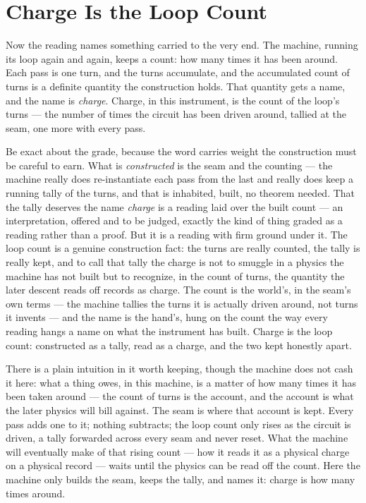 \section{Charge Is the Loop Count}

Now the reading names something carried to the very end. The machine, running its loop again and again, keeps a
count: how many times it has been around. Each pass is one turn, and the turns accumulate, and the accumulated
count of turns is a definite quantity the construction holds. That quantity gets a name, and the name is
\emph{charge}. Charge, in this instrument, is the count of the loop's turns --- the number of
times the circuit has been driven around, tallied at the seam, one more with every pass.

Be exact about the grade, because the word carries weight the construction must be careful to earn. What is
\emph{constructed} is the seam and the counting --- the machine really does re-instantiate each pass from the
last and really does keep a running tally of the turns, and that is inhabited, built, no theorem needed. That the
tally deserves the name \emph{charge} is a reading laid over the built count --- an interpretation, offered and to
be judged, exactly the kind of thing graded as a reading rather than a proof. But it is a reading with
firm ground under it. The loop count is a genuine construction fact: the turns are really counted, the tally is
really kept, and to call that tally the charge is not to smuggle in a physics the machine has not built but to
recognize, in the count of turns, the quantity the later descent reads off records as charge. The count is
the world's, in the seam's own terms --- the machine tallies the turns it is actually driven around, not turns it
invents --- and the name is the hand's, hung on the count the way every reading hangs a name on what the
instrument has built. Charge is the loop count: constructed as a tally, read as a charge, and the two kept
honestly apart.

There is a plain intuition in it worth keeping, though the machine does not cash it here: what a thing owes, in this
machine, is a matter of how many times it has been taken around --- the count of turns is the account, and the
account is what the later physics will bill against. The seam is where that account is kept. Every pass adds one
to it; nothing subtracts; the loop count only rises as the circuit is driven, a tally forwarded across every seam
and never reset. What the machine will eventually make of that rising count --- how it reads it as a physical
charge on a physical record --- waits until the physics can be read off the count. Here the machine only
builds the seam, keeps the tally, and names it: charge is how many times around.
